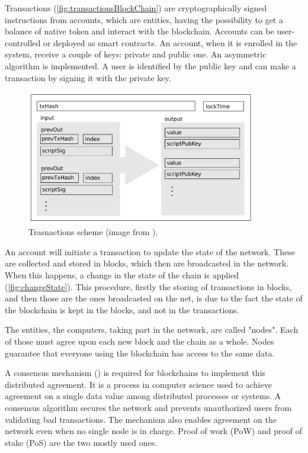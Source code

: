 Transactions (\autoref{fig:transactionsBlockChain}) are cryptographically signed instructions from accounts, 
which are entities, having the possibility to get a balance of native token and interact with the blockchain. 
Accounts can be user-controlled or deployed as smart contracts. 
An account, when it is enrolled in the system, receive a couple of keys: private and public one. 
An asymmetric algorithm is implemented.
A user is identified by the public key and can make a transaction by signing it with the private key.

\begin{figure}
    \centering
    \includegraphics[width=10cm]{logos/Transactions.png}
    \caption{Trasnactions scheme (image from \cite{BlockChain1}).}
    \label{fig:transactionsBlockChain}
\end{figure}

An account will initiate a transaction to update the state of the network. 
These are collected and stored in blocks, which then are broadcasted in the network. 
When this happens, a change in the state of the chain is applied (\autoref{fig:changeState}). 
This procedure, firstly the storing of transactions in blocks, and then those are the ones broadcasted on the net, 
is due to the fact the state of the blockchain is kept in the blocks, and not in the transactions.

The entities, the computers, taking part in the network, are called "nodes". 
Each of those must agree upon each new block and the chain as a whole. 
Nodes guarantee that everyone using the blockchain has access to the same data.

A consensus mechanism (\cite{Consensus}) is required for blockchains to implement this distributed agreement. 
It is a process in computer science used to achieve agreement on a single data value among distributed processes or systems. 
A consensus algorithm secures the network and prevents unauthorized users from validating bad transactions. 
The mechanism also enables agreement on the network even when no single node is in charge.
Proof of work (PoW) and proof of stake (PoS) are the two mostly used ones.

